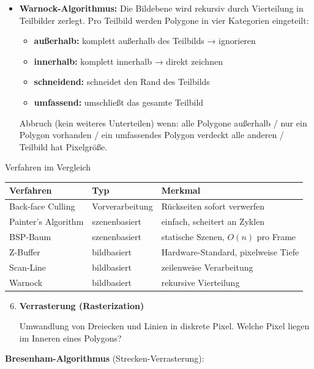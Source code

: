 \documentclass[12pt, a4paper]{article}
\begin{document}
\begin{itemize}
  \item \textbf{Warnock-Algorithmus:} Die Bildebene wird rekursiv durch Vierteilung in Teilbilder zerlegt. Pro Teilbild werden Polygone in vier Kategorien eingeteilt:
  \begin{itemize}
    \item \textbf{außerhalb:} komplett außerhalb des Teilbilds → ignorieren
    \item \textbf{innerhalb:} komplett innerhalb → direkt zeichnen
    \item \textbf{schneidend:} schneidet den Rand des Teilbilds
    \item \textbf{umfassend:} umschließt das gesamte Teilbild
  \end{itemize}
  Abbruch (kein weiteres Unterteilen) wenn: alle Polygone außerhalb / nur ein Polygon vorhanden / ein umfassendes Polygon verdeckt alle anderen / Teilbild hat Pixelgröße.
\end{itemize}

\begin{notebox}{Verfahren im Vergleich}
\begin{tabular}{lll}
  \textbf{Verfahren} & \textbf{Typ} & \textbf{Merkmal} \\
  \hline
  Back-face Culling & Vorverarbeitung & Rückseiten sofort verwerfen \\
  Painter's Algorithm & szenenbasiert & einfach, scheitert an Zyklen \\
  BSP-Baum & szenenbasiert & statische Szenen, $O(n)$ pro Frame \\
  Z-Buffer & bildbasiert & Hardware-Standard, pixelweise Tiefe \\
  Scan-Line & bildbasiert & zeilenweise Verarbeitung \\
  Warnock & bildbasiert & rekursive Vierteilung \\
\end{tabular}
\end{notebox}

\begin{enumerate}
  \setcounter{enumi}{5}

  \item \textbf{Verrasterung (Rasterization)}

  Umwandlung von Dreiecken und Linien in diskrete Pixel. Welche Pixel liegen im Inneren eines Polygons?

\end{enumerate}

\textbf{Bresenham-Algorithmus} (Strecken-Verrasterung):
\end{document}
